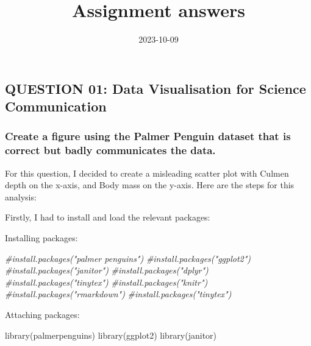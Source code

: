 \documentclass[
]{article}
\title{Assignment answers}
\author{}
\date{\vspace{-2.5em}2023-10-09}
\newenvironment{Shaded}{\begin{snugshade}}{\end{snugshade}}
\newcommand{\CommentTok}[1]{\textcolor[rgb]{0.56,0.35,0.01}{\textit{#1}}}
\newcommand{\FunctionTok}[1]{\textcolor[rgb]{0.00,0.00,0.00}{#1}}
\newcommand{\NormalTok}[1]{#1}
\begin{document}
\maketitle

\hypertarget{question-01-data-visualisation-for-science-communication}{%
\subsection{QUESTION 01: Data Visualisation for Science
Communication}\label{question-01-data-visualisation-for-science-communication}}

\hypertarget{create-a-figure-using-the-palmer-penguin-dataset-that-is-correct-but-badly-communicates-the-data.}{%
\subsubsection{Create a figure using the Palmer Penguin dataset that is
correct but badly communicates the
data.}\label{create-a-figure-using-the-palmer-penguin-dataset-that-is-correct-but-badly-communicates-the-data.}}

For this question, I decided to create a misleading scatter plot with
Culmen depth on the x-axis, and Body mass on the y-axis. Here are the
steps for this analysis:

Firstly, I had to install and load the relevant packages:

Installing packages:

\begin{Shaded}
\begin{Highlighting}[]
\CommentTok{\#install.packages("palmer penguins")}
\CommentTok{\#install.packages("ggplot2")}
\CommentTok{\#install.packages("janitor")}
\CommentTok{\#install.packages("dplyr")}
\CommentTok{\#install.packages("tinytex")}
\CommentTok{\#install.packages("knitr")}
\CommentTok{\#install.packages("rmarkdown")}
\CommentTok{\#install.packages("tinytex")}
\end{Highlighting}
\end{Shaded}

Attaching packages:

\begin{Shaded}
\begin{Highlighting}[]
\FunctionTok{library}\NormalTok{(palmerpenguins)}
\FunctionTok{library}\NormalTok{(ggplot2)}
\FunctionTok{library}\NormalTok{(janitor)}
\end{Highlighting}
\end{Shaded}
\end{document}
